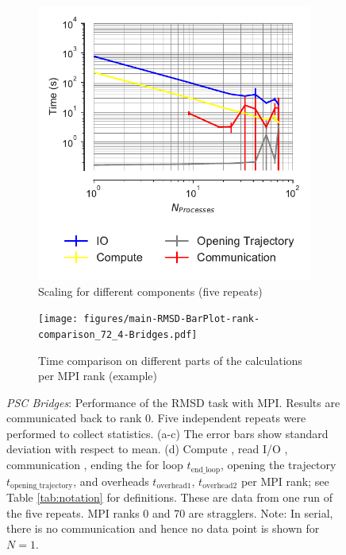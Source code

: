 \begin{figure}[!htb]
  \begin{subfigure}{.4\textwidth}
    \includegraphics[width=\linewidth]{figures/main-RMSD-time_comp_IO_comparison-Bridges.pdf}
    \captionsetup{format=hang}
    \caption{Scaling for different components (five repeats)}
    \label{fig:ScalingComputeIO-Bridges}
  \end{subfigure}
  \hfill
  \begin{subfigure} {.5\textwidth}
    \texttt{[image: figures/main-RMSD-BarPlot-rank-comparison\_72\_4-Bridges.pdf]}
    \captionsetup{format=hang}
    \caption{Time comparison on different parts of the calculations per MPI rank (example)}
    \label{fig:MPIranks-Bridges}
  \end{subfigure}
  \caption{\emph{PSC Bridges}: Performance of the RMSD task with MPI.
    Results are communicated back to rank 0.
    Five independent repeats were performed to collect statistics.
    (a-c) The error bars show standard deviation with respect to mean. (d) Compute \tcomp, read I/O \tIO, communication \tcomm, ending the for loop $t_{\text{end\_loop}}$, opening the trajectory $t_{\text{opening\_trajectory}}$, and overheads $t_{\text{overhead1}}$, $t_{\text{overhead2}}$ per MPI rank; see Table \ref{tab:notation} for definitions.
    These are data from one run of the five repeats.
    MPI ranks 0 and 70 are stragglers.
    Note: In serial, there is no communication and hence no data point is shown for $N=1$.}
\label{fig:MPIwithIO-Bridges}
\end{figure} 



